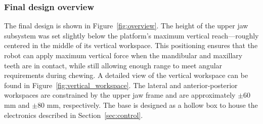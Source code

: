 \subsubsection{Final design overview}

The final design is shown in Figure~\ref{fig:overview}. The height of the upper jaw subsystem was set slightly below the platform's maximum 
vertical reach—roughly centered in the middle of its vertical workspace. This positioning ensures that the robot can apply maximum vertical 
force when the mandibular and maxillary teeth are in contact, while still allowing enough range to meet angular requirements during chewing. 
A detailed view of the vertical workspace can be found in Figure~\ref{fig:vertical_workspace}. The lateral and anterior-posterior workspaces are 
constrained by the upper jaw frame and are approximately $\pm$60 mm and $\pm$80 mm, respectively. 
The base is designed as a hollow box to house the electronics 
described in Section~\ref{sec:control}. 

